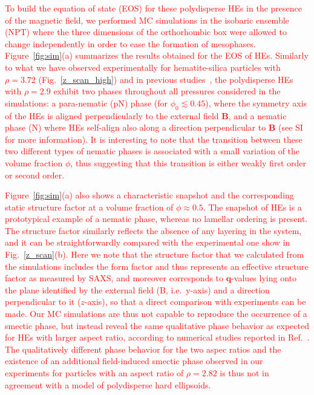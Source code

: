 \documentclass[aps,prl,preprint,superscriptaddress]{revtex4-1} %
\begin{document}
\textcolor{red}{To build the equation of state (EOS) for these polydisperse HEs in the presence of the magnetic field, we performed MC simulations in the isobaric ensemble (NPT) where the three
dimensions of the orthorhombic box were allowed to change independently in order to ease the formation of mesophases. Figure~\ref{fig:sim}(a) summarizes the results obtained for the EOS of HEs. Similarly to what we have observed experimentally for hematite-silica particles with $\rho=3.72$ (Fig.~\ref{z_scan_high}) and in previous studies~\cite{martchenko2016anisotropic}, 
the polydisperse HEs with $\rho = 2.9$ exhibit two phases throughout all pressures considered in the simulations:  
a para-nematic (pN) phase (for $\phi_0\lesssim 0.45$), where the symmetry axis of the HEs is aligned perpendicularly to the 
external field $\mathbf{B}$, and a nematic phase (N) where HEs self-align also along a direction perpendicular to $\mathbf{B}$ 
(see SI for more information). It is interesting to note that the transition between these two different types of nematic phases
is associated with a small variation of the volume fraction $\phi$,
thus suggesting that this transition is either weakly first order or second order.}

\textcolor{red}{Figure~\ref{fig:sim}(a) also shows a characteristic snapshot and the corresponding static structure factor at a volume fraction of $\phi \approx 0.5$. The snapshot of HEs is a prototypical example of a nematic phase, whereas no lamellar ordering is present. 
The structure factor similarly reflects the absence of any layering in the system, and it can 
be straightforwardly compared with the experimental one show in Fig.~\ref{z_scan}(b). Here we note that the structure factor that we calculated from the simulations
includes the form factor and thus represents an effective structure factor as measured by SAXS, and moreover corresponds to $\mathbf{q}$-values lying onto the plane identified by the external field (B, i.e.~y-axis) and 
a direction perpendicular to it ($z$-axis), so that a direct comparison with experiments can be made.
Our MC simulations are thus not capable to reproduce the occurrence of a smectic phase, but instead reveal the same qualitative phase behavior as expected for HEs with larger aspect ratio, according to numerical studies reported in Ref.~\cite{martchenko2016anisotropic}. The qualitatively different phase behavior for the two aspec ratios and the existence of an additional field-induced smectic phase observed in our experiments for particles with an aspect ratio of $\rho = 2.82$ is thus not in agreement with a model of polydisperse hard ellipsoids. }
\end{document}
